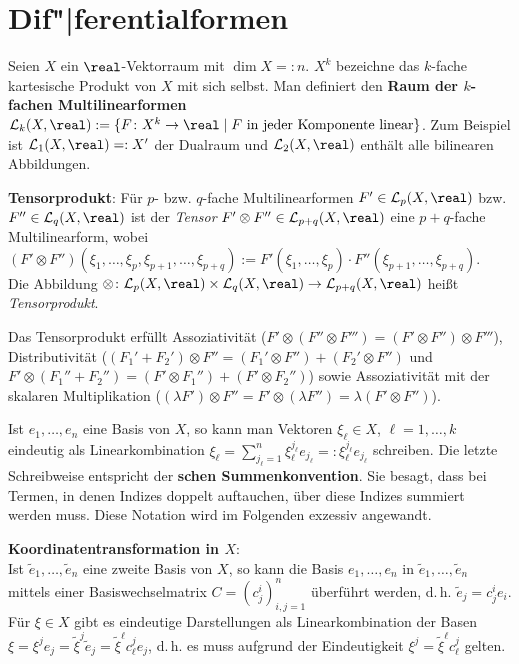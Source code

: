 \pagebreak

\section{%
    Dif"|ferentialformen%
}

Seien $X$ ein $\real$-Vektorraum mit $\dim X =: n$.
$X^k$ bezeichne das $k$-fache kartesische Produkt von $X$ mit sich selbst.
Man definiert den \textbf{Raum der $k$-fachen Multilinearformen} \\
$\L_k(X, \real) := \{F\colon X^k \rightarrow \real \;|\;
F \text{ in jeder Komponente linear}\}$.
Zum Beispiel ist $\L_1(X, \real) =: X'$ der Dualraum und
$\L_2(X, \real)$ enthält alle bilinearen Abbildungen.

\textbf{Tensorprodukt}:
Für $p$- bzw. $q$-fache Multilinearformen $F' \in \L_p(X, \real)$
bzw. $F'' \in \L_q(X, \real)$ ist der \emph{Tensor}
$F' \otimes F'' \in \L_{p+q}(X, \real)$ eine $p + q$-fache Multilinearform,
wobei \\
$(F' \otimes F'')(\xi_1, \dotsc, \xi_p, \xi_{p+1}, \dotsc, \xi_{p+q}) :=
F'(\xi_1, \dotsc, \xi_p) \cdot F''(\xi_{p+1}, \dotsc, \xi_{p+q})$. \\
Die Abbildung $\otimes\colon \L_p(X, \real) \times \L_q(X, \real)
\rightarrow \L_{p+q}(X, \real)$ heißt \emph{Tensorprodukt}.

Das Tensorprodukt erfüllt Assoziativität
($F' \otimes (F'' \otimes F''') = (F' \otimes F'') \otimes F'''$),
Distributivität ($(F_1' + F_2') \otimes F'' =
(F_1' \otimes F'') + (F_2' \otimes F'')$ und
$F' \otimes (F_1'' + F_2'') =
(F' \otimes F_1'') + (F' \otimes F_2'')$) sowie
Assoziativität mit der skalaren Multiplikation
($(\lambda F') \otimes F'' = F' \otimes (\lambda F'') =
\lambda (F' \otimes F'')$).

\linie

Ist $e_1, \dotsc, e_n$ eine Basis von $X$, so kann man Vektoren
$\xi_\ell \in X$, $\ell = 1, \dotsc, k$ eindeutig als Linearkombination
$\xi_\ell = \sum_{j_\ell=1}^n \xi_\ell^{j_\ell} e_{j_\ell} =:
\xi_\ell^{j_\ell} e_{j_\ell}$ schreiben.
Die letzte Schreibweise entspricht der
\textbf{schen Summenkonvention}.
Sie besagt, dass bei Termen, in denen Indizes doppelt auftauchen,
über diese Indizes summiert werden muss.
Diese Notation wird im Folgenden exzessiv angewandt.

\textbf{Koordinatentransformation in $X$}: \\
Ist $\widetilde{e}_1, \dotsc, \widetilde{e}_n$ eine zweite Basis von $X$,
so kann die Basis $e_1, \dotsc, e_n$ in
$\widetilde{e}_1, \dotsc, \widetilde{e}_n$ mittels einer Basiswechselmatrix
$C = (c_j^i)_{i,j=1}^n$ überführt werden,
d.\,h. $\widetilde{e}_j = c_j^i e_i$.
Für $\xi \in X$ gibt es eindeutige Darstellungen als Linearkombination der
Basen $\xi = \xi^j e_j = \widetilde{\xi}^j \widetilde{e}_j =
\widetilde{\xi}^\ell c_\ell^j e_j$, d.\,h. es muss aufgrund der Eindeutigkeit
$\xi^j = \widetilde{\xi}^\ell c_\ell^j$ gelten.

